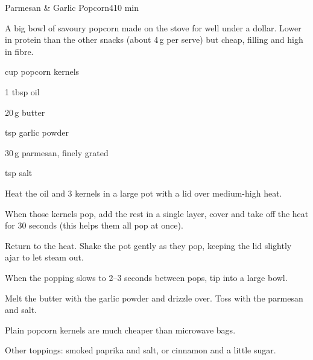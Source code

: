 \begin{recipebox}{Parmesan \& Garlic Popcorn}{4}{10 min}

A big bowl of savoury popcorn made on the stove for well under a dollar.
Lower in protein than the other snacks (about 4\,g per serve) but cheap,
filling and high in fibre.

\begin{ingredients}
  \item {} cup popcorn kernels
  \item 1 tbsp oil
  \item 20\,g butter
  \item {} tsp garlic powder
  \item 30\,g parmesan, finely grated
  \item {} tsp salt
\end{ingredients}

\begin{method}
  \item Heat the oil and 3 kernels in a large pot with a lid over medium-high heat.
  \item When those kernels pop, add the rest in a single layer, cover and take off the heat for 30 seconds (this helps them all pop at once).
  \item Return to the heat. Shake the pot gently as they pop, keeping the lid slightly ajar to let steam out.
  \item When the popping slows to 2--3 seconds between pops, tip into a large bowl.
  \item Melt the butter with the garlic powder and drizzle over. Toss with the parmesan and salt.
\end{method}

\begin{notelist}
  \item Plain popcorn kernels are much cheaper than microwave bags.
  \item Other toppings: smoked paprika and salt, or cinnamon and a little sugar.
\end{notelist}

\end{recipebox}
